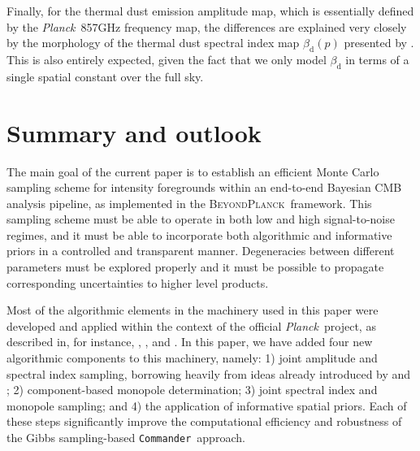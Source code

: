 \documentclass{aa}
\def\Planck{\textit{Planck}}
\def\,{\thinspace}
\def\commander{\texttt{Commander}}
\newcommand{\BP}{\textsc{BeyondPlanck}}
\begin{document}
Finally, for the thermal dust emission amplitude map, which is
essentially defined by the \Planck\ 857\,GHz frequency map, the
differences are explained very closely by the morphology of the
thermal dust spectral index map $\beta_{\mathrm{d}}(p)$ presented by
\citet{planck2014-a12}. This is also entirely expected, given the fact
that we only model $\beta_{\mathrm{d}}$ in terms of a single spatial
constant over the full sky.



\section{Summary and outlook}
\label{sec:conclusions}

The main goal of the current paper is to establish an efficient Monte
Carlo sampling scheme for intensity foregrounds within an end-to-end
Bayesian CMB analysis pipeline, as implemented in the
\BP\ framework. This sampling scheme must be able to operate in both
low and high signal-to-noise regimes, and it must be able to
incorporate both algorithmic and informative priors in a controlled
and transparent manner. Degeneracies between different parameters must
be explored properly and it must be possible to propagate
corresponding uncertainties to higher level products.

Most of the algorithmic elements in the machinery used in this
paper were developed and applied within the context of the official
\Planck\ project, as described in, for instance,
\citet{planck2014-a12}, \citet{planck2016-l04}, and \citet{npipe}. In this paper, we have
added four new algorithmic components to this machinery, namely: 1) joint amplitude
and spectral index sampling, borrowing heavily from ideas already
introduced by \citet{2009MNRAS.392..216S} and \citet{stivoli:2010}; 2)
component-based monopole determination; 3) joint spectral index and
monopole sampling; and 4) the application of informative spatial
priors. Each of these steps significantly improve the computational
efficiency and robustness of the Gibbs sampling-based
\commander\ approach.
\end{document}
